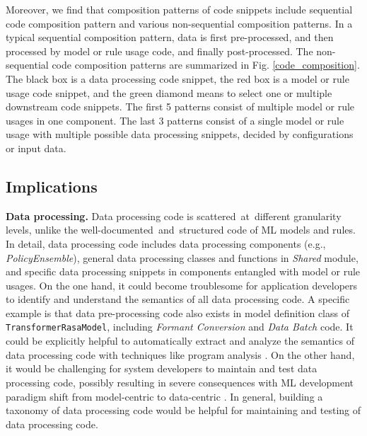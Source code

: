 Moreover, we find that composition patterns of code snippets include sequential code composition pattern and various non-sequential composition patterns.
In a typical sequential composition pattern, data is first pre-processed, and then processed by model or rule usage code, and finally post-processed.
The non-sequential code composition patterns are summarized in Fig. \ref{code_composition}. The black box is a data processing code snippet, the red box is a model or rule usage code snippet, and the green diamond means to select one or multiple downstream code snippets.
The first 5 patterns consist of multiple model or rule usages in one component. %
The last 3 patterns consist of a single model or rule usage with multiple possible data processing snippets, decided by configurations or input data.



\subsection{Implications}

\textbf{Data processing.} Data processing code is scattered~at~different granularity levels, unlike the well-documented~and~structured code of ML models and rules. 
In detail, data processing code includes data processing components (e.g., \textit{PolicyEnsemble}), general data processing classes and functions in \textit{Shared} module, and specific data processing snippets in components entangled with model or rule usages. 
On the one hand, it could become troublesome for application developers to identify and understand the semantics of all data processing code. A specific example is that data pre-processing code also exists in model definition class of \texttt{TransformerRasaModel}, including \textit{Formant Conversion} and \textit{Data Batch} code. It could be explicitly helpful to automatically extract and analyze the semantics of data processing code  with techniques like program analysis \cite{pycg}. On the other hand, it would be challenging for system developers to maintain and test data processing code, possibly resulting in severe consequences with ML development paradigm shift from model-centric  to data-centric \cite{liangAdvancesChallengesOpportunities2022}. 
In general, building a taxonomy of data processing code would be helpful for maintaining and testing of data processing code.


